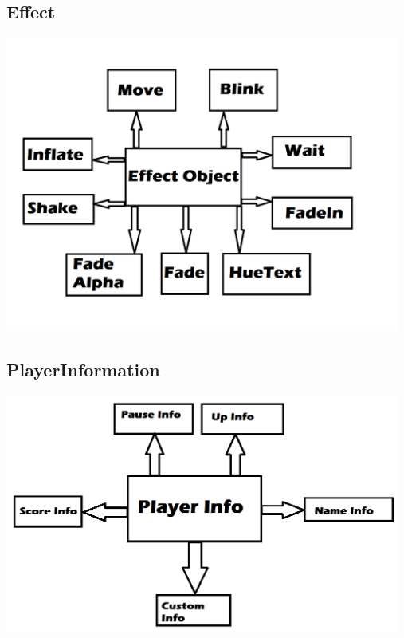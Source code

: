 \documentclass[]{article}
\begin{document}
\subsection*{Effect}
\includegraphics[width=13cm]{Effect}
\subsection*{PlayerInformation}
\includegraphics[width=13cm]{PlayerInformation}
\end{document}
